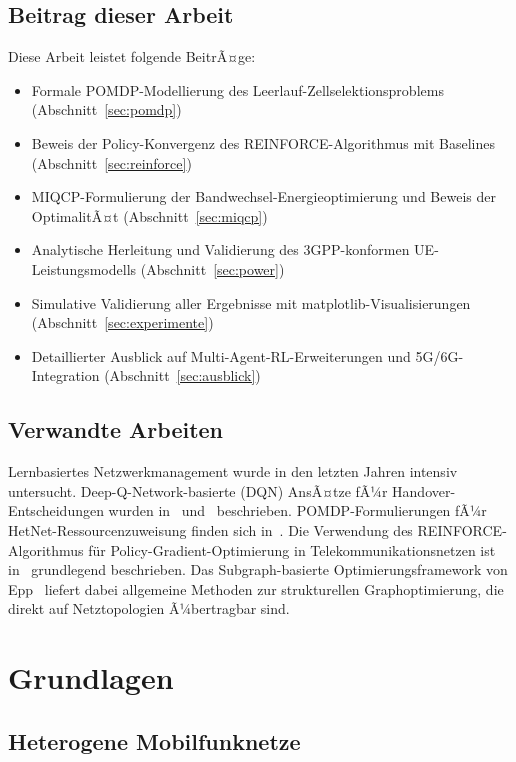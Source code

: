 ﻿\documentclass[a4paper,12pt]{article}
\theoremstyle{definition}
\begin{document}
\subsection{Beitrag dieser Arbeit}

Diese Arbeit leistet folgende BeitrÃ¤ge:
\begin{itemize}
  \item Formale POMDP-Modellierung des Leerlauf-Zellselektionsproblems (Abschnitt~\ref{sec:pomdp})
  \item Beweis der Policy-Konvergenz des REINFORCE-Algorithmus mit Baselines (Abschnitt~\ref{sec:reinforce})
  \item MIQCP-Formulierung der Bandwechsel-Energieoptimierung und Beweis der OptimalitÃ¤t (Abschnitt~\ref{sec:miqcp})
  \item Analytische Herleitung und Validierung des 3GPP-konformen UE-Leistungsmodells (Abschnitt~\ref{sec:power})
  \item Simulative Validierung aller Ergebnisse mit matplotlib-Visualisierungen (Abschnitt~\ref{sec:experimente})
  \item Detaillierter Ausblick auf Multi-Agent-RL-Erweiterungen und 5G/6G-Integration (Abschnitt~\ref{sec:ausblick})
\end{itemize}

\subsection{Verwandte Arbeiten}

Lernbasiertes Netzwerkmanagement wurde in den letzten Jahren intensiv untersucht.
Deep-Q-Network-basierte (DQN) AnsÃ¤tze fÃ¼r Handover-Entscheidungen wurden in~\cite{fehske2011}
und~\cite{zhang2019} beschrieben. POMDP-Formulierungen fÃ¼r HetNet-Ressourcenzuweisung finden
sich in~\cite{li2020}. Die Verwendung des REINFORCE-Algorithmus f\"ur Policy-Gradient-Optimierung
in Telekommunikationsnetzen ist in~\cite{sutton2018} grundlegend beschrieben. Das Subgraph-basierte
Optimierungsframework von Epp~\cite{epp2026sub} liefert dabei allgemeine Methoden zur strukturellen
Graphoptimierung, die direkt auf Netztopologien Ã¼bertragbar sind.

\section{Grundlagen}

\subsection{Heterogene Mobilfunknetze}
\end{document}
